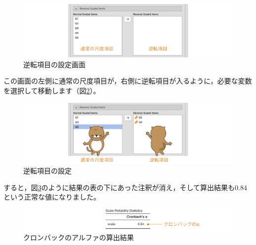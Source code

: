 \documentclass[
  12pt,
  a5jpaper,
  lualatex, ja=standard]{bxjsbook}
\begin{document}
\begin{figure}[!ht]

{\centering \includegraphics[width=1\linewidth]{images/factor/reliability-reverse-items} 

}

\caption{逆転項目の設定画面}\label{fig:factor-reliability-reverse-items}
\end{figure}

この画面の左側に通常の尺度項目が，右側に逆転項目が入るように，必要な変数を選択して移動します（図\ref{fig:factor-reliability-reversed}）。

\begin{figure}[!ht]

{\centering \includegraphics[width=1\linewidth]{images/factor/reliability-reversed} 

}

\caption{逆転項目の設定}\label{fig:factor-reliability-reversed}
\end{figure}

すると，図\ref{fig:factor-reliability-cronbach}のように結果の表の下にあった注釈が消え，そして算出結果も0.84という正常な値になりました。

\begin{figure}[!ht]

{\centering \includegraphics[width=1\linewidth]{images/factor/reliability-cronbach} 

}

\caption{クロンバックのアルファの算出結果}\label{fig:factor-reliability-cronbach}
\end{figure}
\end{document}
